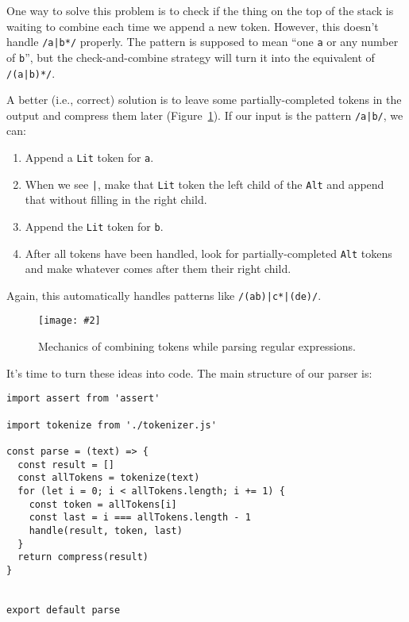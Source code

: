 \documentclass[krantzl]{krantz}
\newcommand{\figpdf}[4]{\begin{figure}%
\centering%
\texttt{[image: \#2]}%
\caption{#3}%
\label{#1}%
\end{figure}}
\newcommand{\figref}[1]{Figure~\ref{#1}}
\begin{document}
\noindent One way to solve this problem is to check if the thing on the top of the stack is waiting to combine
each time we append a new token.
However,
this doesn’t handle \texttt{/a|b*/} properly.
The pattern is supposed to mean “one \texttt{a} or any number of \texttt{b}”,
but the check-and-combine strategy will turn it into the equivalent of \texttt{/(a|b)*/}.


A better (i.e., correct) solution is
to leave some partially-completed tokens in the output and compress them later
(\figref{regex-parser-mechanics}).
If our input is the pattern \texttt{/a|b/}, we can:

\begin{enumerate}

\item 

Append a \texttt{Lit} token for \texttt{a}.



\item 

When we see \texttt{|},
    make that \texttt{Lit} token the left child of the \texttt{Alt}
    and append that without filling in the right child.



\item 

Append the \texttt{Lit} token for \texttt{b}.



\item 

After all tokens have been handled,
    look for partially-completed \texttt{Alt} tokens and make whatever comes after them their right child.



\end{enumerate}


\noindent Again, this automatically handles patterns like \texttt{/(ab)|c*|(de)/}.

\figpdf{regex-parser-mechanics}{./regex-parser/mechanics.pdf}{Mechanics of combining tokens while parsing regular expressions.}{0.6}


It’s time to turn these ideas into code.
The main structure of our parser is:


\begin{lstlisting}[frame=tblr]
import assert from 'assert'

import tokenize from './tokenizer.js'

const parse = (text) => {
  const result = []
  const allTokens = tokenize(text)
  for (let i = 0; i < allTokens.length; i += 1) {
    const token = allTokens[i]
    const last = i === allTokens.length - 1
    handle(result, token, last)
  }
  return compress(result)
}


export default parse
\end{lstlisting}
\end{document}
